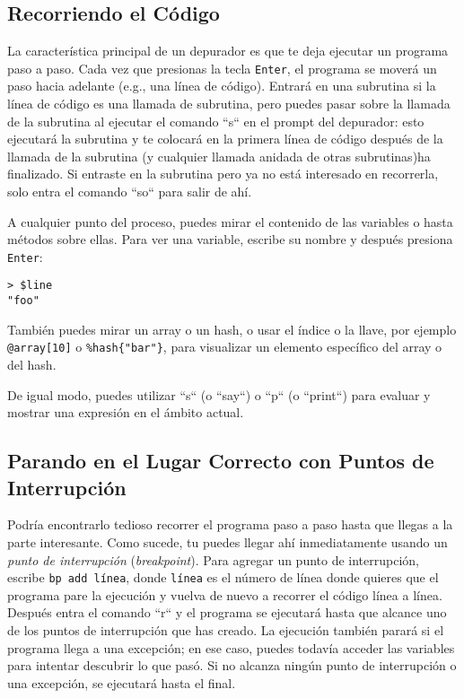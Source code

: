 \subsection{Recorriendo el Código}


La característica principal de un depurador es que
te deja ejecutar un programa paso a paso. Cada vez
que presionas la tecla {\tt Enter}, el programa se
moverá un paso hacia adelante (e.g., una línea de 
código). Entrará en una subrutina si la línea de 
código es una llamada de subrutina, pero puedes pasar 
sobre la llamada de la subrutina al ejecutar el comando
``s`` en el prompt del depurador: esto ejecutará la subrutina
y te colocará en la primera línea de código después de la
llamada de la subrutina (y cualquier llamada anidada de otras
subrutinas)ha finalizado. Si entraste en la subrutina pero ya 
no está interesado en recorrerla, solo entra el comando 
``so`` para salir de ahí.

A cualquier punto del proceso, puedes mirar el contenido 
de las variables o hasta métodos sobre ellas. Para ver
una variable, escribe su nombre y después presiona 
{\tt Enter}:

\begin{verbatim}
> $line
"foo"
\end{verbatim}

También puedes mirar un array o un hash, o usar el
índice o la llave, por ejemplo \verb|@array[10]| o
\verb|%hash{"bar"}|, para visualizar un elemento específico
del array o del hash.

De igual modo, puedes utilizar ``s`` (o ``say``) o ``p`` (o ``print``)
para evaluar y mostrar una expresión en el ámbito actual.

\subsection{Parando en el Lugar Correcto con Puntos de Interrupción}

Podría encontrarlo tedioso recorrer el programa paso a paso
hasta que llegas a la parte interesante. Como sucede, 
tu puedes llegar ahí inmediatamente usando un \emph{punto de
interrupción} (\emph{breakpoint}). Para agregar un punto de 
interrupción, escribe {\tt bp add línea}, donde {\tt línea} es
el número de línea donde quieres que el programa pare 
la ejecución y vuelva de nuevo a recorrer el código línea a 
línea. Después entra el comando ``r`` y el programa se ejecutará
hasta que alcance uno de los puntos de interrupción que has creado.
La ejecución también parará si el programa llega a una excepción;
en ese caso, puedes todavía acceder las variables para intentar 
descubrir lo que pasó. Si no alcanza ningún punto de interrupción
o una excepción, se ejecutará hasta el final.

